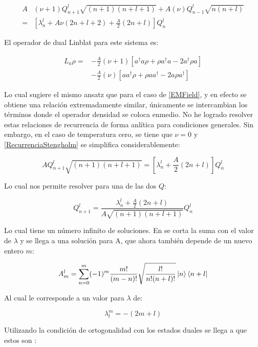 \documentclass[a4paper,10pt]{report}
\begin{document}
\begin{align}\label{RecurrenciaStengholm}
A&(\nu+1) Q_{n+1}^l \sqrt{(n+1)(n+l+1) }+ A(\nu) Q_{n-1}^l\sqrt{n(n+l)}\\ \nonumber
=&[\lambda_n^l+A\nu(2n+l+2)+\frac{A}{2}(2n+l)]Q_{n}^l
\end{align}

El operador de dual Linblat para este sistema es:

\begin{align}
L_a \rho =& - \frac{A}{2}(\nu + 1)[a^\dagger a\rho + \rho a^\dagger a -2a^\dagger\rho a] \nonumber \\
 &- \frac{A}{2}(\nu)[ aa^\dagger\rho + \rho  aa^\dagger -2a\rho a^\dagger]
\end{align}

Lo cual sugiere el mismo ansatz que para el caso de \ref{EMField}, y en efecto se obtiene una relación extremadamente similar, únicamente se intercambian los términos donde el operador densidad se coloca enmedio. No he logrado resolver estas relaciones de recurrencia de forma anlítica para condiciones generales. Sin embargo, en el caso de temperatura cero, se tiene que $\nu = 0$ y \ref{RecurrenciaStengholm} se simplifica considerablemente:

\begin{equation}
AQ_{n+1}^l\sqrt{(n+1)(n+l+1)}=[\lambda_n^l + \frac{A}{2}(2n+l)]Q_n^l
\end{equation}

Lo cual nos permite resolver para una de las dos $Q$:

\begin{equation}
Q_{n+1}^l = \frac{\lambda_n^l + \frac{A}{2}(2n+l)}{A\sqrt{(n+1)(n+l+1)}}Q_n^l
\end{equation}

Lo cual tiene un número infinito de soluciones. En \cite{BarnettSD} se corta la suma con el valor de $\lambda$ y se llega a una solución para A, que ahora también depende de un nuevo entero $m$:

\begin{equation}
A_m^l = \sum_{n=0}^m (-1)^m \frac{m!}{(m-n)!}\sqrt{\frac{l!}{n!(n+l)!}}\Ket{n}\Bra{n+l}
\end{equation}

Al cual le corresponde a un valor para $\lambda$ de:

\begin{equation}
\lambda_l^m = -(2m+l)
\end{equation}

Utilizando la condición de ortogonalidad con los estados duales se llega a que estos son \cite{BarnettSD}:
\end{document}
